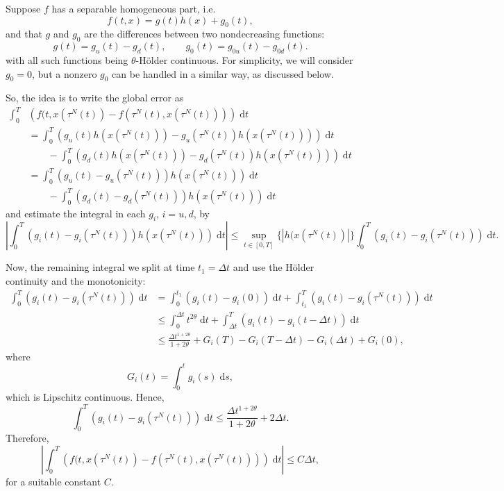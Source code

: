 \documentclass[reqno,12pt]{amsart}
\theoremstyle{plain}%
\theoremstyle{definition}
\begin{document}
Suppose $f$ has a separable homogeneous part, i.e.
$$
  f(t, x) = g(t)h(x) + g_0(t),
$$
and that $g$ and $g_0$ are the differences between two nondecreasing functions:
$$
  g(t) = g_u(t) - g_d(t), \qquad g_0(t) = g_{0u}(t) - g_{0d}(t).
$$
with all such functions being $\theta$-H\"older continuous. For simplicity, we will consider $g_0 = 0$, but a nonzero $g_0$ can be handled in a similar way, as discussed below.

So, the idea is to write the global error as
\begin{align*}
    \int_0^T  &  \left(f(t, x(\tau^N(t)) - f(\tau^N(t), x(\tau^N(t)))\right)\;\mathrm{d}t  \\
    & = \int_0^T \left(g_u(t)h(x(\tau^N(t))) - g_u(\tau^N(t))h(x(\tau^N(t)))\right)\;\mathrm{d}t  \\
    & \qquad - \int_0^T \left(g_d(t)h(x(\tau^N(t))) - g_d(\tau^N(t))h(x(\tau^N(t)))\right)\;\mathrm{d}t \\
    & = \int_0^T (g_u(t) - g_u(\tau^N(t)))h(x(\tau^N(t)))\;\mathrm{d}t  \\
    & \qquad - \int_0^T (g_d(t) - g_d(\tau^N(t)))h(x(\tau^N(t)))\;\mathrm{d}t 
\end{align*}
and estimate the integral in each $g_i$, $i=u, d$, by
\[
  \left|\int_0^T (g_i(t) - g_i(\tau^N(t)))h(x(\tau^N(t)))\;\mathrm{d}t  \right|
  \leq \sup_{t\in [0, T]}\{|h(x(\tau^N(t))|\}\int_0^T (g_i(t) - g_i(\tau^N(t)))\;\mathrm{d}t.
\]

Now, the remaining integral we split at time $t_1 = \Delta t$ and use the H\"older continuity and the monotonicity:
\begin{align*}
  \int_0^T (g_i(t) - g_i(\tau^N(t)))\;\mathrm{d}t & = \int_0^{t_1} (g_i(t) - g_i(0))\;\mathrm{d}t + \int_{t_1}^T (g_i(t) - g_i(\tau^N(t)))\;\mathrm{d}t \\
    & \leq \int_0^{\Delta t} t^{2\theta}\;\mathrm{d}t + \int_{\Delta t}^T (g_i(t) - g_i(t - \Delta t))\;\mathrm{d}t \\
    & \leq \frac{\Delta t^{1 + 2\theta}}{1 + 2\theta} + G_i(T) - G_i(T - \Delta t) - G_i(\Delta t) + G_i(0),
\end{align*}
where
\[
  G_i(t) = \int_0^t g_i(s) \;\mathrm{d}s,
\]
which is Lipschitz continuous. Hence,
\[
  \int_0^T (g_i(t) - g_i(\tau^N(t)))\;\mathrm{d}t \leq \frac{\Delta t^{1 + 2\theta}}{1 + 2\theta} + 2 \Delta t.
\]
Therefore,
\[
  \left|\int_0^T \left(f(t, x(\tau^N(t)) - f(\tau^N(t), x(\tau^N(t)))\right)\;\mathrm{d}t \right| \leq C\Delta t,
\]
for a suitable constant $C$.
\end{document}
